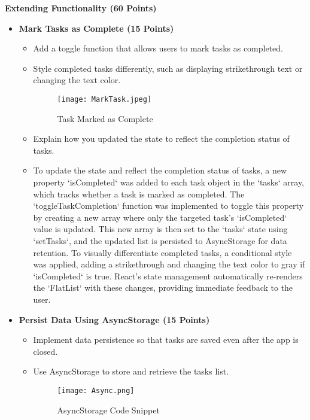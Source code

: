 \documentclass{article}
\begin{document}
\textbf{Extending Functionality (60 Points)}
\begin{itemize}
    \item \textbf{Mark Tasks as Complete (15 Points)}
    \begin{itemize}
        \item Add a toggle function that allows users to mark tasks as completed.
        \item Style completed tasks differently, such as displaying strikethrough text or changing the text color.
        \begin{figure}[H]
            \centering
            \texttt{[image: MarkTask.jpeg]}
            \caption{Task Marked as Complete}
        \end{figure}
     
        \item Explain how you updated the state to reflect the completion status of tasks.
        \item To update the state and reflect the completion status of tasks, a new property `isCompleted` was added to each task object in the `tasks` array, which tracks whether a task is marked as completed. The `toggleTaskCompletion` function was implemented to toggle this property by creating a new array where only the targeted task's `isCompleted` value is updated. This new array is then set to the `tasks` state using `setTasks`, and the updated list is persisted to AsyncStorage for data retention. To visually differentiate completed tasks, a conditional style was applied, adding a strikethrough and changing the text color to gray if `isCompleted` is true. React's state management automatically re-renders the `FlatList` with these changes, providing immediate feedback to the user.
    \end{itemize}
    
    \item \textbf{Persist Data Using AsyncStorage (15 Points)}
    \begin{itemize}
        \item Implement data persistence so that tasks are saved even after the app is closed.
        \item Use AsyncStorage to store and retrieve the tasks list.
        \begin{figure}[H]
            \centering
            \texttt{[image: Async.png]}
            \caption{AsyncStorage Code Snippet}
        \end{figure}
    \end{itemize}
    

\end{itemize}
\end{document}
